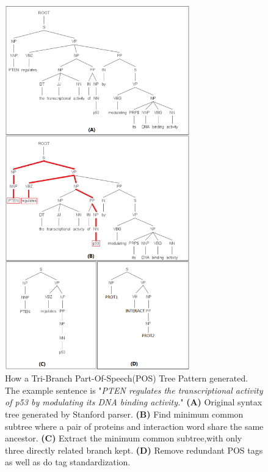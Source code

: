 \begin{flushleft}
\begin{figure}
\includegraphics[width=80mm]{fig/figure5.png}
\caption{How a Tri-Branch Part-Of-Speech(POS) Tree Pattern generated. The example sentence is "\emph{PTEN regulates the transcriptional activity of p53 by modulating its DNA binding activity.}" \textbf{(A)} Original syntax tree generated by Stanford parser. \textbf{(B)} Find minimum common subtree where a pair of proteins and interaction word share the same ancestor. \textbf{(C)} Extract the minimum common subtree,with only three directly related branch kept. \textbf{(D)} Remove redundant POS tags as well as do tag standardization.}
\label{fig:postree}
\end{figure}
\end{flushleft}

